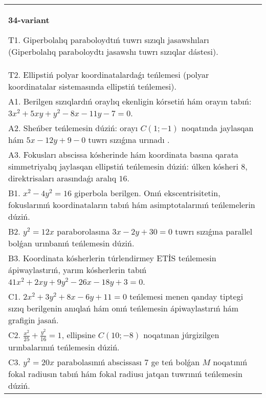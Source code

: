 \documentclass{article}
\begin{document}
\begin{tabular}{m{17cm}}
\textbf{34-variant}
\newline

T1. Giperbolalıq paraboloydtıń tuwrı sızıqlı jasawshıları (Giperbolalıq paraboloydtı jasawshı tuwrı sızıqlar dástesi).\\

T2. Ellipstiń polyar koordinatalardaǵı teńlemesi (polyar koordinatalar sistemasında ellipstiń teńlemesi).\\

A1. Berilgen sızıqlardıń oraylıq ekenligin kórsetiń hám orayın tabıń: $3 x^{2}+5 xy+y^{2}-8 x-11 y-7=0$.\\

A2. Sheńber teńlemesin dúziń: orayı $C (1;-1) $ noqatında jaylasqan hám $5 x-12 y+9 -0$ tuwrı sızıǵına urınadı .\\

A3. Fokusları abscissa kósherinde hám koordinata basına qarata simmetriyalıq jaylasqan ellipstiń teńlemesin dúziń: úlken kósheri $8$, direktrisaları arasındaǵı aralıq $16$.\\

B1. $x^{2} - 4y^{2} = 16$ giperbola berilgen. Onıń ekscentrisitetin, fokuslarınıń koordinataların tabıń hám asimptotalarınıń teńlemelerin dúziń.\\

B2. $y^{2} = 12x$ paraborolasına $3x - 2y + 30 = 0$ tuwrı sızıǵına parallel bolǵan urınbanıń teńlemesin dúziń.  \\

B3. Koordinata kósherlerin túrlendirmey ETİS teńlemesin ápiwaylastırıń, yarım kósherlerin tabıń $41x^{2} + 2xy + 9y^{2} - 26x - 18y + 3 = 0$.  \\

C1. $2x^{2} + 3y^{2} + 8x - 6y + 11 = 0$ teńlemesi menen qanday tiptegi sızıq berilgenin anıqlań hám onıń teńlemesin ápiwaylastırıń hám grafigin jasań.  \\

C2. $\frac{x^{2}}{25} + \frac{y^{2}}{16} = 1$, ellipsine $C(10; - 8)$ noqatınan júrgizilgen urınbalarınıń teńlemesin dúziń.  \\

C3. $y^{2} = 20x$ parabolasınıń abscissası 7 ge teń bolǵan $M$ noqatınıń fokal radiusın tabıń hám fokal radiusı jatqan tuwrınıń teńlemesin dúziń.  \\

\end{tabular}
\vspace{1cm}
\end{document}
